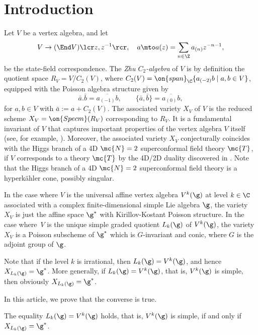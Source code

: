 \vspace*{-2\baselineskip}\vskip0pt
\section{Introduction}
Let $V$ be a vertex algebra,
and let
\[
V\to (\End V)\lcr z,z^{-1}\rcr,\quad a\mto a(z)=\sum_{n\in \Z}a_{(n)}z^{-n-1},
\]
be the state-field correspondence.
The \emph{Zhu $C_2$-algebra} \cite{Zhu96} of $V$ is by definition the quotient space
$R_V=V/C_2(V)$,
where $C_2(V)=\on{span}_{\C}\{a_{(-2)}b\mid a,b\in V\}$,
equipped with the Poisson algebra structure given by
\[
\bar a. \bar b=\overline{a_{(-1)}b},\qquad \{\bar a,\bar b\}=\overline{a_{(0)}b},
\]
for $a,b \in V$ with $\bar a := a+C_2(V)$.
The associated variety $X_V$ of $V$ is the reduced scheme
$X_V=\on{Specm}(R_V)$
corresponding to $R_V$.
It is a fundamental invariant of $V$ that captures important properties
of the vertex algebra $V$ itself (see, for example, \cite{BeiFeiMaz,Zhu96,AbeBuhDon04,Miy04,Ara12,Ara09b,A2012Dec,AM15,AM16,Arakawa-Kawasetsu}).
Moreover, the associated variety $X_V$
conjecturally \cite{BeeRas} coincides with
the Higgs branch of
a 4D $\mc{N}=2$ superconformal field theory $\mc{T}$,
if $V$ corresponds to a theory $\mc{T}$
by the 4D/2D duality discovered in \cite{BeeLemLie15}.
Note that the Higgs branch of a 4D $\mc{N}=2$ superconformal field theory
is a hyperkähler cone, possibly singular.

In the case where $V$ is
the universal affine vertex algebra $V^k(\g)$ at level $k \in\C$
associated with a complex finite-dimensional simple Lie algebra $\g$,
the variety $X_V$ is just the affine space $\g^*$ with Kirillov-Kostant Poisson structure.
In the case where~$V$ is
the unique simple graded quotient $L_k(\g)$
of $V^k(\g)$,
the variety $X_V$ is a Poisson subscheme of $\g^*$
which is $G$-invariant and conic, where $G$ is the adjoint group of $\g$.

Note that if the level $k$ is irrational,
then
$L_k(\g)=V^k(\g)$,
and hence $X_{L_k(\g)}=\g^*$.
More generally, if $L_k(\g)=V^k(\g)$, that is, $V^k(\g)$
is simple, then obviously
\hbox{$X_{L_k(\g)}=\g^*$.}

In this article, we prove that the converse is true.

\begin{theorem}\label{MainTheorem}
\label{Th:main}
The equality $L_k(\g)=V^k(\g)$ holds, that is,
$V^k(\g)$
is simple, if and only if $X_{L_k(\g)} = \g^*$.
\end{theorem}

